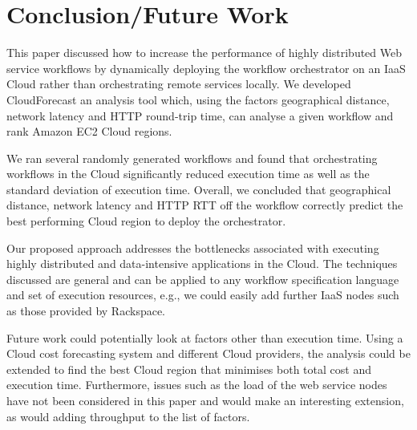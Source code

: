 \documentclass[10pt, conference, compsocconf]{IEEEtran}
\newcommand{\sysname}{CloudForecast\xspace}
\begin{document}
\section{Conclusion/Future Work}
This paper discussed how to increase the performance of highly distributed Web service workflows by dynamically deploying the workflow orchestrator on an IaaS Cloud rather than orchestrating remote services locally. We developed \sysname an analysis tool which, using the factors geographical distance, network latency and HTTP round-trip time, can analyse a given workflow and rank Amazon EC2 Cloud regions.

We ran several randomly generated workflows and found that orchestrating workflows in the Cloud significantly reduced execution time as well as the standard deviation of execution time. Overall, we concluded that geographical distance, network latency and HTTP RTT off the workflow correctly predict the best performing Cloud region to deploy the orchestrator.

Our proposed approach addresses the bottlenecks associated with executing highly distributed and data-intensive applications in the Cloud. The techniques discussed are general and can be applied to any workflow specification language and set of execution resources, e.g., we could easily add further IaaS nodes such as those provided by Rackspace.

Future work could potentially look at factors other than execution time. Using a Cloud cost forecasting system and different Cloud providers, the analysis could be extended to find the best Cloud region that minimises both total cost and execution time. Furthermore, issues such as the load of the web service nodes have not been considered in this paper and would make an interesting extension, as would adding throughput to the list of factors.















 
\end{document}
